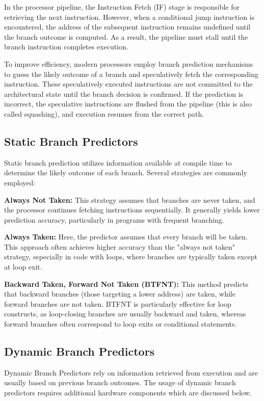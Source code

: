 In the processor pipeline, the Instruction Fetch (IF) stage is responsible for retrieving the next instruction. However, when a conditional jump instruction is encountered, the address of the subsequent instruction remains undefined until the branch outcome is computed. As a result, the pipeline must stall until the branch instruction completes execution.

To improve efficiency, modern processors employ branch prediction mechanisms to guess the likely outcome of a branch and speculatively fetch the corresponding instruction. These speculatively executed instructions are not committed to the architectural state until the branch decision is confirmed. If the prediction is incorrect, the speculative instructions are flushed from the pipeline (this is also called squashing), and execution resumes from the correct path.

\subsection{Static Branch Predictors}

Static branch prediction utilizes information available at compile time to determine the likely outcome of each branch. Several strategies are commonly employed:

\textbf{Always Not Taken:} This strategy assumes that branches are never taken, and the processor continues fetching instructions sequentially. It generally yields lower prediction accuracy, particularly in programs with frequent branching.

\textbf{Always Taken:} Here, the predictor assumes that every branch will be taken. This approach often achieves higher accuracy than the "always not taken" strategy, especially in code with loops, where branches are typically taken except at loop exit.

\textbf{Backward Taken, Forward Not Taken (BTFNT):} This method predicts that backward branches (those targeting a lower address) are taken, while forward branches are not taken. BTFNT is particularly effective for loop constructs, as loop-closing branches are usually backward and taken, whereas forward branches often correspond to loop exits or conditional statements.

\subsection{Dynamic Branch Predictors}

Dynamic Branch Predictors rely on information retrieved from execution and are usually based on previous branch outcomes. The usage of dynamic branch predictors requires additional hardware components which are discussed below.

